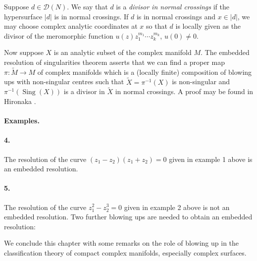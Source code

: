 \begin{center}
    \begin{minipage}{\linewidth}
        \centering
        
    \end{minipage}
\end{center}
Suppose $d\in\mathcal D(N)$. We say that $d$ is a \emph{divisor in normal crossings} if the hypersurface $|d|$ is in normal crossings. If $d$ is in normal crossings and $x\in|d|$, we may choose complex analytic coordinates at $x$ so that $d$ is locally given as the divisor of the meromorphic function $u(z)z_1^{m_1}\cdots z_k^{m_k}$, $u(0)\neq0$.

Now suppose $X$ is an analytic subset of the complex manifold $M$. The embedded resolution of singularities theorem asserts that we can find a proper map $\pi:\widetilde M\longrightarrow M$ of complex manifolds which is a (locally finite) composition of blowing ups with non-singular centres such that $\widetilde X=\pi^{-1}(X)$ is non-singular and $\pi^{-1}(\operatorname{Sing}(X))$ is a divisor in $\widetilde X$ in normal crossings. A proof may be found in Hironaka \cite{bib:I:hironaka-h:2}.

\paragraph*{Examples.}
\paragraph*{4.} The resolution of the curve $(z_1-z_2)(z_1+z_2)=0$ given in example 1 above is an embedded resolution.

\paragraph*{5.} The resolution of the curve $z_1^2-z_2^3=0$ given in example 2 above is not an embedded resolution. Two further blowing ups are needed to obtain an embedded resolution:

\begin{center}
    \begin{minipage}{\linewidth}
        \centering
        
    \end{minipage}
\end{center}
We conclude this chapter with some remarks on the role of blowing up in the classification theory of compact complex manifolds, especially complex surfaces.

